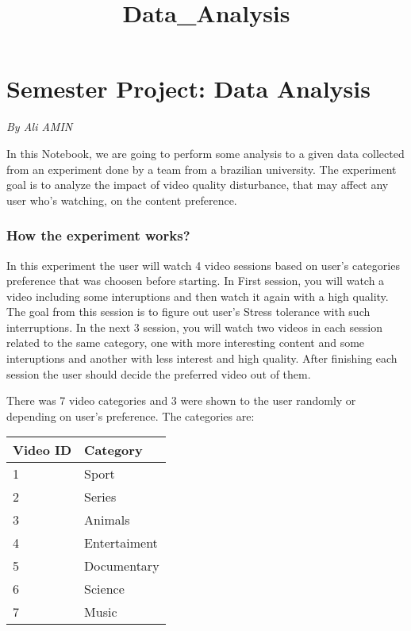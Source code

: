 \documentclass[11pt]{article}
\title{Data\_Analysis}
\begin{document}
    
    
    \maketitle
    
    

    
    \hypertarget{semester-project-data-analysis}{%
\section{Semester Project: Data
Analysis}\label{semester-project-data-analysis}}

\emph{By Ali AMIN}

    In this Notebook, we are going to perform some analysis to a given data
collected from an experiment done by a team from a brazilian university.
The experiment goal is to analyze the impact of video quality
disturbance, that may affect any user who's watching, on the content
preference.

\hypertarget{how-the-experiment-works}{%
\subsubsection{How the experiment
works?}\label{how-the-experiment-works}}

In this experiment the user will watch 4 video sessions based on user's
categories preference that was choosen before starting. In First
session, you will watch a video including some interuptions and then
watch it again with a high quality. The goal from this session is to
figure out user's Stress tolerance with such interruptions. In the next
3 session, you will watch two videos in each session related to the same
category, one with more interesting content and some interuptions and
another with less interest and high quality. After finishing each
session the user should decide the preferred video out of them.

There was 7 video categories and 3 were shown to the user randomly or
depending on user's preference. The categories are:

\begin{longtable}[]{@{}ll@{}}
\toprule
Video ID & Category\tabularnewline
\midrule
\endhead
1 & Sport\tabularnewline
2 & Series\tabularnewline
3 & Animals\tabularnewline
4 & Entertaiment\tabularnewline
5 & Documentary\tabularnewline
6 & Science\tabularnewline
7 & Music\tabularnewline
\bottomrule
\end{longtable}
\end{document}

